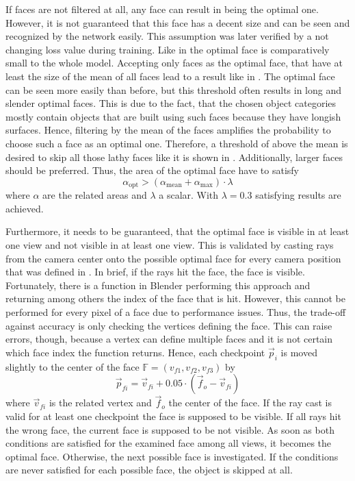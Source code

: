 If faces are not filtered at all, any face can result in being the optimal one.
However, it is not guaranteed that this face has a decent size and can be seen and recognized by the network easily.
This assumption was later verified by a not changing loss value during training.
Like in  the optimal face is comparatively small to the whole model.
Accepting only faces as the optimal face, that have at least the size of the mean of all faces lead to a result like in .
The optimal face can be seen more easily than before, but this threshold often results in long and slender optimal faces.
This is due to the fact, that the chosen object categories mostly contain objects that are built using such faces because they have longish surfaces.
Hence, filtering by the mean of the faces amplifies the probability to choose such a face as an optimal one.
Therefore, a threshold of above the mean is desired to skip all those lathy faces like it is shown in .
Additionally, larger faces should be preferred.
Thus, the area of the optimal face have to satisfy
\begin{equation}
	\alpha_{\text{opt}} > (\alpha_{\text{mean}} + \alpha_{\text{max}}) \cdot \lambda
\end{equation}
where $\alpha$ are the related areas and $\lambda$ a scalar.
With $\lambda = 0.3$ satisfying results are achieved.

Furthermore, it needs to be guaranteed, that the optimal face is visible in at least one view and not visible in at least one view.
This is validated by casting rays from the camera center onto the possible optimal face for every camera position that was defined in .
In brief, if the rays hit the face, the face is visible.
Fortunately, there is a function in Blender performing this approach and returning among others the index of the face that is hit.
However, this cannot be performed for every pixel of a face due to performance issues.
Thus, the trade-off against accuracy is only checking the vertices defining the face.
This can raise errors, though, because a vertex can define multiple faces and it is not certain which face index the function returns.
Hence, each checkpoint $\vec{p}_i$ is moved slightly to the center of the face $\mathbb{F} = (v_{f1}, v_{f2}, v_{f3})$ by
\begin{equation}
	\vec{p}_{fi} = \vec{v}_{fi} + 0.05 \cdot (\vec{f}_o - \vec{v}_{fi})
\end{equation}
where $\vec{v}_{fi}$ is the related vertex and $\vec{f}_o$ the center of the face.
If the ray cast is valid for at least one checkpoint the face is supposed to be visible.
If all rays hit the wrong face, the current face is supposed to be not visible.
As soon as both conditions are satisfied for the examined face among all views, it becomes the optimal face.
Otherwise, the next possible face is investigated.
If the conditions are never satisfied for each possible face, the object is skipped at all.

